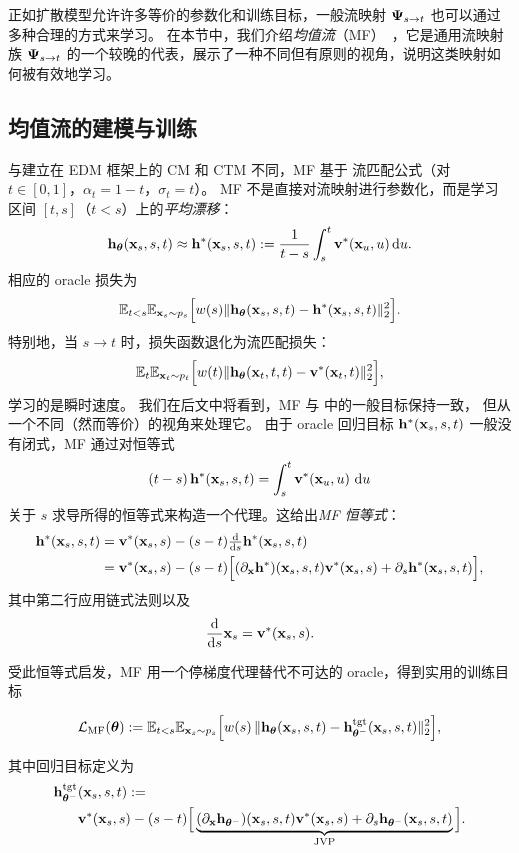 正如扩散模型允许许多等价的参数化和训练目标，一般流映射 ${\bm{\Psi}}_{s\to t}$ 也可以通过多种合理的方式来学习。
在本节中，我们介绍\emph{均值流}（MF）~\citep{geng2025mean}，它是通用流映射族 ${\bm{\Psi}}_{s\to t}$ 的一个较晚的代表，展示了一种不同但有原则的视角，说明这类映射如何被有效地学习。



\subsection{均值流的建模与训练}

与建立在 EDM 框架上的 CM 和 CTM 不同，MF 基于
流匹配公式（对 $t\in[0,1]$，$\alpha_t = 1-t$，$\sigma_t  = t$）。
MF 不是直接对流映射进行参数化，而是学习区间 $[t,s]$（$t<s$）上的\emph{平均漂移}：
\[
{\mathbf{h}}_{{\bm{\theta}}}({\mathbf{x}}_s, s, t)  \approx
{\mathbf{h}}^*({\mathbf{x}}_s, s, t) := \frac{1}{t-s}\int_s^t {\mathbf{v}}^*({\mathbf{x}}_u,u) \mathop{}\!\mathrm{d} u.
\]
相应的 oracle 损失为
\begin{align}\label{eq:mf-oracle}
\mathbb{E}_{t<s} \mathbb{E}_{{\mathbf{x}}_s\sim p_s}\Big[w(s)
\|{\mathbf{h}}_{{\bm{\theta}}}({\mathbf{x}}_s,s,t) - {\mathbf{h}}^*({\mathbf{x}}_s,s,t)\|_2^2\Big].
\end{align}
特别地，当 $s \to t$ 时，损失函数退化为流匹配损失：
\begin{align}\label{eq:mf-to-fm}
    \mathbb{E}_{t} \mathbb{E}_{{\mathbf{x}}_t\sim p_t}\Big[w(t)
\|{\mathbf{h}}_{{\bm{\theta}}}({\mathbf{x}}_t,t,t) - {\mathbf{v}}^*({\mathbf{x}}_t,t)\|_2^2\Big],
\end{align}
学习的是瞬时速度。
我们在后文中将看到，MF 与
中的一般目标保持一致，
但从一个不同（然而等价）的视角来处理它。
由于 oracle 回归目标 ${\mathbf{h}}^*({\mathbf{x}}_s,s,t)$ 一般没有闭式，MF 通过对恒等式
\[
(t-s)\,{\mathbf{h}}^*({\mathbf{x}}_s,s,t) = \int_s^t {\mathbf{v}}^*({\mathbf{x}}_u,u)\,\mathop{}\!\mathrm{d} u
\]
关于 $s$ 求导所得的恒等式来构造一个代理。这给出\emph{MF 恒等式}：
\begin{align}\label{eq:mf-identity}
\begin{aligned}
    {\mathbf{h}}^*({\mathbf{x}}_s,s,t)
&= {\mathbf{v}}^*({\mathbf{x}}_s,s) - (s-t) \tfrac{\mathop{}\!\mathrm{d}}{\mathop{}\!\mathrm{d} s}{\mathbf{h}}^*({\mathbf{x}}_s,s,t) \\
&= {\mathbf{v}}^*({\mathbf{x}}_s,s) - (s-t)\Big[(\partial_{{\mathbf{x}}}{\mathbf{h}}^*)({\mathbf{x}}_s,s,t) {\mathbf{v}}^*({\mathbf{x}}_s,s) 
+ \partial_s {\mathbf{h}}^*({\mathbf{x}}_s,s,t)\Big],
\end{aligned}
\end{align}
其中第二行应用链式法则以及
\[
\frac{\mathop{}\!\mathrm{d}}{\mathop{}\!\mathrm{d} s}{\mathbf{x}}_s = {\mathbf{v}}^*({\mathbf{x}}_s,s).
\]

受此恒等式启发，MF 用一个停梯度代理替代不可达的 oracle，得到实用的训练目标
\begin{mdframed}
\begin{align}\label{eq:mf-practice}
    \mathcal{L}_{\mathrm{MF}}({\bm{\theta}})
:= \mathbb{E}_{t<s} \mathbb{E}_{{\mathbf{x}}_s\sim p_s}\Big[w(s)\,
\|{\mathbf{h}}_{{\bm{\theta}}}({\mathbf{x}}_s,s,t) - {\mathbf{h}}_{{\bm{\theta}}^-}^{\mathrm{tgt}}({\mathbf{x}}_s,s,t)\|_2^2\Big],
\end{align}
\end{mdframed}
其中回归目标定义为
\begin{align*}
    {\mathbf{h}}_{{\bm{\theta}}^-}^{\mathrm{tgt}}&({\mathbf{x}}_s,s,t)
:= \\ &{\mathbf{v}}^*({\mathbf{x}}_s,s) - (s-t)\Big[\underbrace{(\partial_{{\mathbf{x}}}{\mathbf{h}}_{{\bm{\theta}}^-})({\mathbf{x}}_s,s,t) {\mathbf{v}}^*({\mathbf{x}}_s,s)
+ \partial_s {\mathbf{h}}_{{\bm{\theta}}^-}({\mathbf{x}}_s,s,t)}_{\mathrm{JVP}}\Big].
\end{align*}

